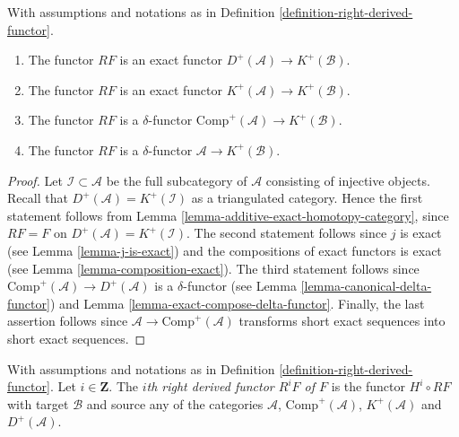 \begin{lemma}
\label{lemma-right-derived-properties}
With assumptions and notations as in
Definition \ref{definition-right-derived-functor}.
\begin{enumerate}
\item The functor $RF$ is an exact functor
$D^{+}(\mathcal{A}) \to K^{+}(\mathcal{B})$.
\item The functor $RF$ is an exact functor
$K^{+}(\mathcal{A}) \to K^{+}(\mathcal{B})$.
\item The functor $RF$ is a $\delta$-functor
$\text{Comp}^{+}(\mathcal{A}) \to K^{+}(\mathcal{B})$.
\item The functor $RF$ is a $\delta$-functor
$\mathcal{A} \to K^{+}(\mathcal{B})$.
\end{enumerate}
\end{lemma}

\begin{proof}
Let $\mathcal{I} \subset \mathcal{A}$ be the full subcategory of $\mathcal{A}$
consisting of injective objects. Recall that
$D^{+}(\mathcal{A}) = K^{+}(\mathcal{I})$ as a triangulated category.
Hence the first statement follows from
Lemma \ref{lemma-additive-exact-homotopy-category}, since
$RF = F$ on $D^{+}(\mathcal{A}) = K^{+}(\mathcal{I})$.
The second statement follows since
$j$ is exact (see Lemma \ref{lemma-j-is-exact}) and the compositions of exact
functors is exact (see Lemma \ref{lemma-composition-exact}).
The third statement follows since
$\text{Comp}^{+}(\mathcal{A}) \to D^{+}(\mathcal{A})$ is a $\delta$-functor
(see Lemma \ref{lemma-canonical-delta-functor})
and Lemma \ref{lemma-exact-compose-delta-functor}.
Finally, the last assertion follows since
$\mathcal{A} \to \text{Comp}^{+}(\mathcal{A})$
transforms short exact sequences into short exact sequences.
\end{proof}

\begin{definition}
\label{definition-higher-derived-functors}
With assumptions and notations as in
Definition \ref{definition-right-derived-functor}.
Let $i \in \mathbf{Z}$.
The {\it $i$th right derived functor $R^iF$ of $F$} is the functor
$H^i \circ RF$ with target $\mathcal{B}$ and source
any of the categories $\mathcal{A}$, $\text{Comp}^{+}(\mathcal{A})$,
$K^{+}(\mathcal{A})$ and $D^{+}(\mathcal{A})$.
\end{definition}

